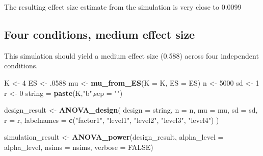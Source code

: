 \documentclass[
]{book}
\newenvironment{Shaded}{\begin{snugshade}}{\end{snugshade}}
\newcommand{\DataTypeTok}[1]{\textcolor[rgb]{0.13,0.29,0.53}{#1}}
\newcommand{\DecValTok}[1]{\textcolor[rgb]{0.00,0.00,0.81}{#1}}
\newcommand{\FloatTok}[1]{\textcolor[rgb]{0.00,0.00,0.81}{#1}}
\newcommand{\KeywordTok}[1]{\textcolor[rgb]{0.13,0.29,0.53}{\textbf{#1}}}
\newcommand{\NormalTok}[1]{#1}
\newcommand{\OtherTok}[1]{\textcolor[rgb]{0.56,0.35,0.01}{#1}}
\newcommand{\StringTok}[1]{\textcolor[rgb]{0.31,0.60,0.02}{#1}}
\begin{document}
The resulting effect size estimate from the simulation is very close to 0.0099

\hypertarget{four-conditions-medium-effect-size}{%
\subsection{Four conditions, medium effect size}\label{four-conditions-medium-effect-size}}

This simulation should yield a medium effect size (0.588) across four independent conditions.

\begin{Shaded}
\begin{Highlighting}[]
\NormalTok{K <-}\StringTok{ }\DecValTok{4}
\NormalTok{ES <-}\StringTok{ }\FloatTok{.0588}
\NormalTok{mu <-}\StringTok{ }\KeywordTok{mu_from_ES}\NormalTok{(}\DataTypeTok{K =}\NormalTok{ K, }\DataTypeTok{ES =}\NormalTok{ ES)}
\NormalTok{n <-}\StringTok{ }\DecValTok{5000}
\NormalTok{sd <-}\StringTok{ }\DecValTok{1}
\NormalTok{r <-}\StringTok{ }\DecValTok{0}
\NormalTok{string =}\StringTok{ }\KeywordTok{paste}\NormalTok{(K,}\StringTok{"b"}\NormalTok{,}\DataTypeTok{sep =} \StringTok{""}\NormalTok{)}
\end{Highlighting}
\end{Shaded}

\begin{Shaded}
\begin{Highlighting}[]
\NormalTok{design_result <-}\StringTok{ }\KeywordTok{ANOVA_design}\NormalTok{(}
  \DataTypeTok{design =}\NormalTok{ string,}
  \DataTypeTok{n =}\NormalTok{ n,}
  \DataTypeTok{mu =}\NormalTok{ mu,}
  \DataTypeTok{sd =}\NormalTok{ sd,}
  \DataTypeTok{r =}\NormalTok{ r,}
  \DataTypeTok{labelnames =} \KeywordTok{c}\NormalTok{(}\StringTok{"factor1"}\NormalTok{, }\StringTok{"level1"}\NormalTok{, }\StringTok{"level2"}\NormalTok{, }\StringTok{"level3"}\NormalTok{, }\StringTok{"level4"}\NormalTok{)}
\NormalTok{  )}
\end{Highlighting}
\end{Shaded}

\begin{Shaded}
\begin{Highlighting}[]
\NormalTok{simulation_result <-}\StringTok{ }\KeywordTok{ANOVA_power}\NormalTok{(design_result, }
                                 \DataTypeTok{alpha_level =}\NormalTok{ alpha_level, }
                                 \DataTypeTok{nsims =}\NormalTok{ nsims,}
                                 \DataTypeTok{verbose =} \OtherTok{FALSE}\NormalTok{)}
\end{Highlighting}
\end{Shaded}
\end{document}
